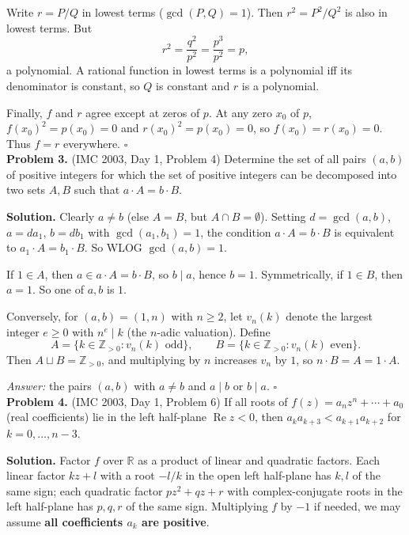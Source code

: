 \documentclass{article}
\newcommand{\R}{\mathbb{R}}
\newcommand{\Z}{\mathbb{Z}}
\begin{document}
Write \( r = P/Q \) in lowest terms (\( \gcd(P, Q) = 1 \)). Then \( r^2 = P^2/Q^2 \) is also in lowest terms. But
\[
r^2 = \frac{q^2}{p^2} = \frac{p^3}{p^2} = p,
\]
a polynomial. A rational function in lowest terms is a polynomial iff its denominator is constant, so \( Q \) is constant and \( r \) is a polynomial.

Finally, \( f \) and \( r \) agree except at zeros of \( p \). At any zero \( x_0 \) of \( p \), \( f(x_0)^2 = p(x_0) = 0 \) and \( r(x_0)^2 = p(x_0) = 0 \), so \( f(x_0) = r(x_0) = 0 \). Thus \( f = r \) everywhere. \hfill\(\square\)
\\

\textbf{Problem 3.} (IMC 2003, Day 1, Problem 4)
Determine the set of all pairs \( (a, b) \) of positive integers for which the set of positive integers can be decomposed into two sets \( A, B \) such that \( a \cdot A = b \cdot B \).

\textbf{Solution.}
Clearly \( a \neq b \) (else \( A = B \), but \( A \cap B = \emptyset \)). Setting \( d = \gcd(a, b) \), \( a = d a_1 \), \( b = d b_1 \) with \( \gcd(a_1, b_1) = 1 \), the condition \( a \cdot A = b \cdot B \) is equivalent to \( a_1 \cdot A = b_1 \cdot B \). So WLOG \( \gcd(a, b) = 1 \).

If \( 1 \in A \), then \( a \in a \cdot A = b \cdot B \), so \( b \mid a \), hence \( b = 1 \). Symmetrically, if \( 1 \in B \), then \( a = 1 \). So one of \( a, b \) is \( 1 \).

Conversely, for \( (a, b) = (1, n) \) with \( n \geq 2 \), let \( v_n(k) \) denote the largest integer \( e \geq 0 \) with \( n^e \mid k \) (the \( n \)-adic valuation). Define
\[
A = \{k \in \Z_{>0} : v_n(k) \text{ odd}\}, \qquad B = \{k \in \Z_{>0} : v_n(k) \text{ even}\}.
\]
Then \( A \sqcup B = \Z_{>0} \), and multiplying by \( n \) increases \( v_n \) by \( 1 \), so \( n \cdot B = A = 1 \cdot A \).

\textit{Answer:} the pairs \( (a, b) \) with \( a \neq b \) and \( a \mid b \) or \( b \mid a \). \hfill\(\square\)
\\

\textbf{Problem 4.} (IMC 2003, Day 1, Problem 6)
If all roots of \( f(z) = a_n z^n + \cdots + a_0 \) (real coefficients) lie in the left half-plane \( \operatorname{Re} z < 0 \), then \( a_k a_{k+3} < a_{k+1} a_{k+2} \) for \( k = 0, \ldots, n-3 \).

\textbf{Solution.}
Factor \( f \) over \( \R \) as a product of linear and quadratic factors. Each linear factor \( kz + l \) with a root \( -l/k \) in the open left half-plane has \( k, l \) of the same sign; each quadratic factor \( pz^2 + qz + r \) with complex-conjugate roots in the left half-plane has \( p, q, r \) of the same sign. Multiplying \( f \) by \( -1 \) if needed, we may assume \textbf{all coefficients \( a_k \) are positive}.
\end{document}
